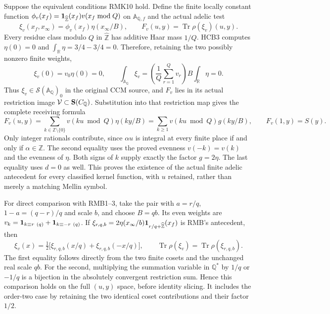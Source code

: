 Suppose the equivalent conditions RMK10 hold. Define the finite
locally constant function
$\phi_v(x_f)={\bf1}_{\widehat{\mathbb Z}}(x_f)
v(x_f\bmod Q)$ on $\mathbb A_{\mathbb Q,f}$ and the actual adelic test
\begin{equation}\tag{RMK17}
 \xi_v(x_f,x_\infty)=\phi_v(x_f)\eta(x_\infty/B),\qquad
 F_v(u,y)=\operatorname{Tr}\rho(\xi_v)(u,y).
\end{equation}
Every residue class modulo $Q$ in $\widehat{\mathbb Z}$ has additive
Haar mass $1/Q$. HCB3 computes $\eta(0)=0$ and
$\int_{\mathbb R}\eta=3/4-3/4=0$. Therefore, retaining the two
possibly nonzero finite weights,
\begin{equation}\tag{RMK18}
 \xi_v(0)=v_0\eta(0)=0,\qquad
 \int_{\mathbb A_{\mathbb Q}}\xi_v
       =\left(\frac1Q\sum_{r=1}^Qv_r\right)B
                   \int_{\mathbb R}\eta=0.
\end{equation}
Thus $\xi_v\in\mathcal S(\mathbb A_{\mathbb Q})_0$ in the original
CCM source, and $F_v$ lies in its actual restriction image
$\mathcal V\subset{\bf S}(C_{\mathbb Q})$. Substitution into that
restriction map gives the complete receiving formula
\begin{equation}\tag{RMK19}
 F_v(u,y)=\sum_{k\in\mathbb Z\setminus\{0\}}
       v(ku\bmod Q)\eta(ky/B)
       =\sum_{k\geq1}v(ku\bmod Q)g(ky/B),\qquad
 F_v(1,y)=S(y).
\end{equation}
Only integer rationals contribute, since $\alpha u$ is integral at
every finite place if and only if $\alpha\in\mathbb Z$.
The second equality uses the proved evenness $v(-k)=v(k)$ and the
evenness of $\eta$. Both signs of $k$ supply exactly the factor
$g=2\eta$. The last equality uses $d=0$ as well. This proves the
existence of the actual finite adelic antecedent for every classified
kernel function, with $u$ retained, rather than merely a matching
Mellin symbol.

For direct comparison with RMB1--3, take the pair with
$a=r/q$, $1-a=(q-r)/q$ and scale $b$, and choose $B=qb$.
Its even weights are
$v_k={\bf1}_{k\equiv r\ (q)}+{\bf1}_{k\equiv-r\ (q)}$.
If $\xi_{r,q,b}=2\eta(x_\infty/b)
{\bf1}_{r/q+\widehat{\mathbb Z}}(x_f)$ is RMB's antecedent, then
\begin{equation}\tag{RMK20}
 \xi_v(x)=\tfrac12\big[\xi_{r,q,b}(x/q)
                            +\xi_{r,q,b}(-x/q)\big],\qquad
 \operatorname{Tr}\rho(\xi_v)=\operatorname{Tr}\rho(\xi_{r,q,b}).
\end{equation}
The first equality follows directly from the two finite cosets and
the unchanged real scale $qb$. For the second, multiplying the
summation variable in $\mathbb Q^*$ by $1/q$ or $-1/q$ is a
bijection in the absolutely convergent restriction sum. Hence this
comparison holds on the full $(u,y)$ space, before identity slicing.
It includes the order-two case by retaining the two identical
coset contributions and their factor $1/2$.

